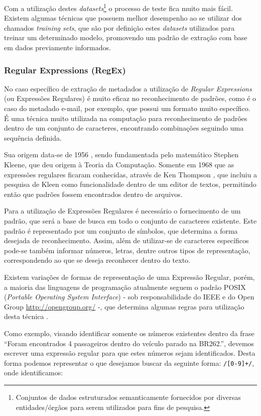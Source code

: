 Com a utilização destes \emph{datasets}\footnote{Conjuntos de dados estruturados semanticamente fornecidos por diversas entidades/órgãos para serem utilizados para fins de pesquisa.} o processo de teste fica muito mais fácil. Existem algumas técnicas que possuem melhor desempenho ao se utilizar dos chamados \emph{training sets}, que são por definição estes \emph{datasets} utilizados para treinar um determinado modelo, promovendo um padrão de extração com base em dados previamente informados.

\subsubsection{Regular Expressions (RegEx)}
\label{sssec:regular-expressions}

No caso específico de extração de metadados a utilização de \emph{Regular Expressions} (ou Expressões Regulares) é muito eficaz no reconhecimento de padrões, como é o caso do metadado e-mail, por exemplo, que possui um formato muito específico. É uma técnica muito utilizada na computação para reconhecimento de padrões dentro de um conjunto de caracteres, encontrando combinações seguindo uma sequência definida.

Sua origem data-se de 1956 \cite{kleene-1956}, sendo fundamentada pelo matemático Stephen Kleene, que deu origem à Teoria da Computação. Somente em 1968 que as expressões regulares ficaram conhecidas, através de Ken Thompson \cite{thompson-1968}, que incluiu a pesquisa de Kleen como funcionalidade dentro de um editor de textos, permitindo então que padrões fossem encontrados dentro de arquivos.

Para a utilização de Expressões Regulares é necessário o fornecimento de um padrão, que será a base de busca em todo o conjunto de caracteres existente. Este padrão é representado por um conjunto de símbolos, que determina a forma desejada de reconhecimento. Assim, além de utilizar-se de caracteres específicos pode-se também informar números, letras, dentre outros tipos de representação, correspondendo ao que se deseja reconhecer dentro do texto.

Existem variações de formas de representação de uma Expressão Regular, porém, a maioria das linguagens de programação atualmente seguem o padrão POSIX (\emph{Portable Operating System Interface}) - sob responsabilidade do IEEE e do Open Group \url{http://opengroup.org/} -, que determina algumas regras para utilização desta técnica \cite{posix-2013}.

Como exemplo, visando identificar somente os números existentes dentro da frase ``Foram encontrados 4 passageiros dentro do veículo parado na BR262.'', devemos escrever uma expressão regular para que estes números sejam identificados. Desta forma podemos representar o que desejamos buscar da seguinte forma: \texttt{/[0-9]+/}, onde identificamos:

